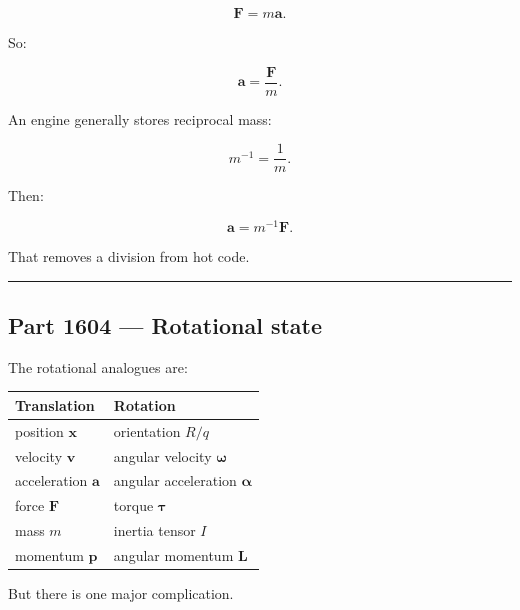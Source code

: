 \[
\mathbf{F}=m\mathbf{a}.
\]

So:

\[
\mathbf{a}
=
\frac{\mathbf{F}}{m}.
\]

An engine generally stores reciprocal mass:

\[
m^{-1}
=
\frac{1}{m}.
\]

Then:

\[
\mathbf{a}
=
m^{-1}\mathbf{F}.
\]

That removes a division from hot code.

\begin{center}\rule{0.5\linewidth}{0.5pt}\end{center}

\subsection{Part 1604 --- Rotational state}\label{06-engine-ii-ch034-part-1604-rotational-state}

\hypertarget{06-engine-ii-ch034-part-1604-rotational-state}{}

The rotational analogues are:

{\def\LTcaptype{none} %
\begin{longtable}[]{@{}
  >{\raggedright\arraybackslash}p{}
  >{\raggedright\arraybackslash}p{}@{}}
\toprule\noalign{}
\begin{minipage}[b]{\linewidth}\raggedright
Translation
\end{minipage} & \begin{minipage}[b]{\linewidth}\raggedright
Rotation
\end{minipage} \\
\midrule\noalign{}
\endhead
\bottomrule\noalign{}
\endlastfoot
position \(\mathbf{x}\) & orientation \(R/q\) \\
velocity \(\mathbf{v}\) & angular velocity \(\boldsymbol{\omega}\) \\
acceleration \(\mathbf{a}\) & angular acceleration \(\boldsymbol{\alpha}\) \\
force \(\mathbf{F}\) & torque \(\boldsymbol{\tau}\) \\
mass \(m\) & inertia tensor \(I\) \\
momentum \(\mathbf{p}\) & angular momentum \(\mathbf{L}\) \\
\end{longtable}
}

But there is one major complication.

